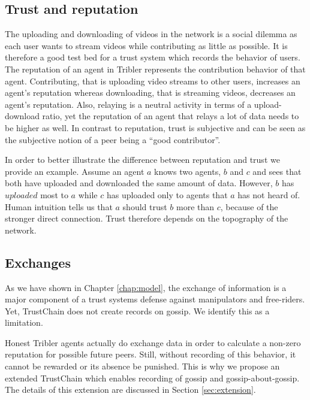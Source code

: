 \subsection{Trust and reputation}
The uploading and downloading of videos in the network is a social dilemma as each user wants to 
stream videos while contributing as little as possible. It is therefore a good test bed for a trust 
system which records the behavior of users. The reputation of an agent in Tribler represents the 
contribution behavior of that agent. Contributing, that is uploading video streams to other users,
increases an agent's reputation whereas downloading, that is streaming videos, decreases an agent's 
reputation. Also, relaying is a neutral activity in terms of a upload-download ratio, yet the 
reputation of an agent that relays a lot of data needs to be higher as well. In contrast to 
reputation, trust is subjective and can be seen as the subjective notion of a peer being a 
``good contributor''. 

In order to better illustrate the difference between reputation and trust we provide an example.
Assume an agent $a$ knows two agents, $b$ and $c$ and sees that both have uploaded and downloaded 
the same amount of data. However, $b$ has $uploaded$ most to $a$ while $c$ has uploaded only to 
agents that $a$ has not heard of. Human intuition tells us that $a$ should trust $b$ more than $c$, 
because of the stronger direct connection. Trust therefore depends on the topography of the network.


\subsection{Exchanges}
As we have shown in Chapter \ref{chap:model}, the exchange of information is a major component of a trust 
systems defense against manipulators and free-riders. Yet, TrustChain does not create records on 
gossip. We identify this as a limitation. 

Honest Tribler agents actually do exchange data in order to calculate a non-zero reputation for possible
future peers. Still, without recording of this behavior, it cannot be rewarded or its absence be punished. 
This is why we propose an extended TrustChain which enables recording of gossip and gossip-about-gossip. 
The details of this extension are discussed in Section \ref{sec:extension}.

